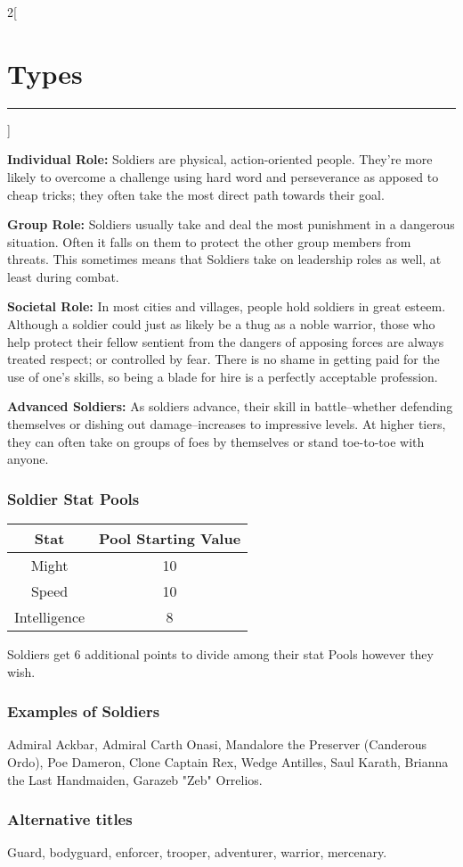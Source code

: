\documentclass[a4paper,10pt,final]{book}
\newcommand{\HRule}{\rule{\linewidth}{0.5mm}} %
\newcommand{\newSection}[1]{\section*{#1} \addcontentsline{toc}{section}{#1} \label{sec:#1} \HRule}
\newcommand{\statPool}[5]
{
	\subsubsection*{#1 Stat Pools}
	\label{subsub:#1StatPools} 	
	\begin{center}
	\begin{tabular}{ |c|c| } 
	\hline
	\textbf{Stat} & \textbf{Pool Starting Value} \\ 
	\hline \hline
	Might & #2 \\ 
	\hline
 	Speed & #3  \\
 	\hline 
 	Intelligence & #4  \\ 
 	\hline
	\end{tabular}
	\end{center}
	#1s get #5 additional points to divide among their stat Pools however they wish.
}
\newcommand{\itemLine}[2]{\textbf{#1:} {#2}\par}
\newenvironment{docsection}[1]
{
  \begin{multicols*}{2}[\newSection{#1}]
}
{
  \end{multicols*}
  \newpage
}
\begin{document}
\begin{docsection}{Types}
\itemLine{Individual Role} {Soldiers are physical, action-oriented people. They're more likely to overcome a challenge using hard word and perseverance as apposed to cheap tricks; they often take the most direct path towards their goal.}
\itemLine{Group Role} {Soldiers usually take and deal the most punishment in a dangerous situation. Often it falls on them to protect the other group members from threats. This sometimes means that Soldiers take on leadership roles as well, at least during combat.}
\itemLine{Societal Role} {In most cities and villages, people hold soldiers in great esteem. Although a soldier could just as likely be a thug as a noble warrior, those who help protect their fellow sentient from the dangers of apposing forces are always treated respect; or controlled by fear. There is no shame in getting paid for the use of one’s skills, so being a blade for hire is a perfectly acceptable profession.}
\itemLine{Advanced Soldiers} {As soldiers advance, their skill in battle--whether defending themselves or dishing out damage--increases to impressive levels. At higher tiers, they can often take on groups of foes by themselves or stand toe-to-toe with anyone.}

\statPool{Soldier}{10}{10}{8}{6}

\subsubsection*{Examples of Soldiers}
\label{subsub:soldierExamples}
Admiral Ackbar, Admiral Carth Onasi, Mandalore the Preserver (Canderous Ordo), Poe Dameron, Clone Captain Rex, Wedge Antilles, Saul Karath, Brianna the Last Handmaiden, Garazeb "Zeb" Orrelios.

\subsubsection*{Alternative titles}
\label{subsub:soldierAlternative}
Guard, bodyguard, enforcer, trooper, adventurer, warrior, mercenary.


\end{docsection}
\end{document}
